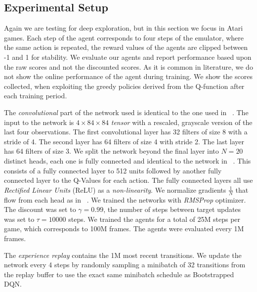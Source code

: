 \subsection{Experimental Setup}
Again we are testing for deep exploration, but in this section we focus in Atari games. Each step of the agent corresponds to four steps of the emulator, where the same action is repeated, the reward values of the agents are clipped between -1 and 1 for stability. We evaluate our agents and report performance based upon the raw scores and not the discounted scores. As it is common in literature, we do not show the online performance of the agent during training. We show the scores collected, when exploiting the greedy policies derived from the Q-function after each training period.\par
The \emph{convolutional} part of the network used is identical to the one used in ~\cite{DBLP:journals/corr/OsbandBPR16}. The input to the network is $4\times 84 \times 84$ \emph{tensor} with a rescaled, grayscale version of the last four observations. The first convolutional layer has 32 filters of size 8 with a stride of 4. The second layer has 64 filters of size 4 with stride 2. The last layer has 64 filters of size 3. We split the network beyond the final layer into $N = 20$ distinct heads, each one is fully connected and identical to the network in ~\cite{DBLP:journals/corr/OsbandBPR16}. This consists of a fully connected layer to 512 units followed by another fully connected layer to the Q-Values for each action. The fully connected layers all use \emph{Rectified Linear Units} (ReLU) as a \emph{non-linearity}. We normalize gradients $\frac{1}{N}$ that flow from each head as in ~\cite{DBLP:journals/corr/OsbandBPR16}.
We trained the networks with \emph{RMSProp} optimizer. The discount was set to $\gamma = 0.99$, the number of steps between target updates was set to $\tau= 10000$ steps. We trained the agents for a total of 25M steps per game, which corresponds to 100M frames. The agents were evaluated every 1M frames. \par
The \emph{experience replay} contains the 1M most recent transitions. We update the network every 4 steps by randomly sampling a minibatch of 32 transitions from the replay buffer to use the exact same minibatch schedule as Bootstrapped DQN. 